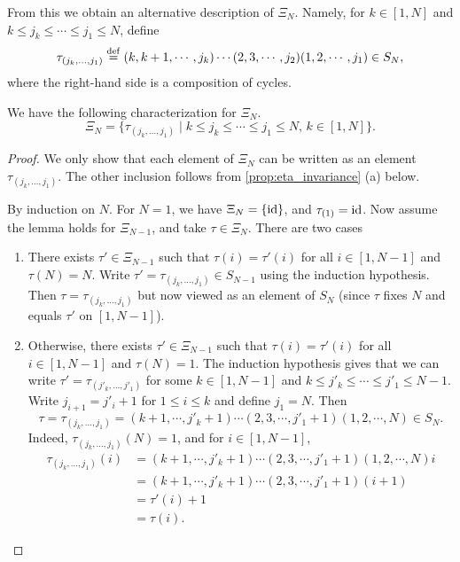 From this we obtain an alternative description of $\Xi_N$. Namely, for $k\in [1, N]$
and $k \leq j_k \leq \cdots \leq j_1 \leq N$, define
\begin{equation*}
	\tau_{(j_k, \dots, j_1)} \overset{\mathrm{def}}{=} (k,k+1, \cdots, j_k)\cdots (2,3, \cdots, j_2)(1,2,\cdots, j_1)\in S_N,
\end{equation*}
%
%
where the right-hand side is a composition of cycles.
\begin{lemma}
	We have the following characterization for $\Xi_N$.
	\begin{equation*}
		\Xi_N = \{\tau_{(j_k, \dots, j_1)} \mid k \leq j_k \leq \cdots \leq j_1 \leq N,\, k\in [1, N]\}.
	\end{equation*}
\end{lemma}
\begin{proof}
	We only show that each element of $\Xi_N$ can be written as an element $\tau_{(j_k, \dots, j_1)}$. The other inclusion follows from \cref{prop:eta_invariance} (a) below.

	By induction on $N$. For $N = 1$, we have $\Xi_N = \{\operatorname{id}\}$, and $\tau_{(1)} = \operatorname{id}$.
	Now assume the lemma holds for $\Xi_{N-1}$, and take $\tau \in \Xi_N$. There are two
	cases
	\begin{enumerate}
		\item There exists $\tau' \in \Xi_{N-1}$ such that $\tau(i) = \tau'(i)$ for all $i\in [1,
				      N-1]$ and $\tau(N) = N$. Write $\tau' = \tau_{(j_k, \dots, j_1)} \in S_{N-1}$ using the
		      induction hypothesis. Then $\tau = \tau_{(j_k, \dots, j_1)}$ but now viewed as an
		      element of $S_N$ (since $\tau$ fixes $N$ and equals $\tau'$ on $[1, N-1]$).
		\item Otherwise, there exists $\tau' \in \Xi_{N-1}$ such that $\tau(i) = \tau'(i)$ for all
		      $i\in [1, N-1]$ and $\tau(N) = 1$. The induction hypothesis gives that we can write
		      $\tau' = \tau_{(j'_k, \dots, j'_1)}$ for some $k \in [1, N - 1]$ and $k \leq j'_k \leq
			      \cdots \leq j'_1 \leq N - 1$. Write $j_{i+1} = j'_i + 1$ for $1 \leq i \leq k$ and
		      define $j_1 = N$. Then
		      \begin{equation*}
			      \tau = \tau_{(j_k, \dots, j_1)} = (k+1, \cdots, j'_k + 1) \cdots (2, 3, \cdots ,j'_1 + 1)(1,2, \cdots, N) \in S_N.
		      \end{equation*}
		      Indeed, $\tau_{(j_k, \dots, j_1)}(N) = 1$, and for $i \in [1, N-1]$,
		      \begin{align*}
			      \tau_{(j_k, \dots, j_1)}(i)
			       & = (k+1, \cdots, j'_k + 1) \cdots (2, 3, \cdots, j'_1 + 1)(1,2, \cdots, N) i \\
			       & = (k+1, \cdots, j'_k + 1) \cdots (2, 3, \cdots, j'_1 + 1) (i+1)             \\
			       & = \tau'(i) + 1                                                              \\
			       & = \tau(i).
		      \end{align*}
	\end{enumerate}
\end{proof}

